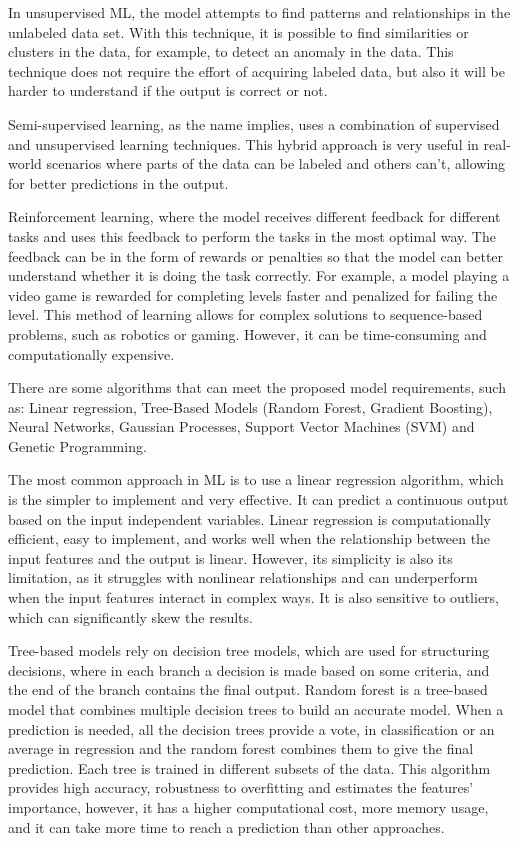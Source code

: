 \documentclass[sigplan]{acmart}
\begin{document}
In unsupervised ML, the model attempts to find patterns and relationships in the unlabeled data set. With this technique, it is possible to find similarities or clusters in the data, for example, to detect an anomaly in the data. This technique does not require the effort of acquiring labeled data, but also it will be harder to understand if the output is correct or not.

Semi-supervised learning, as the name implies, uses a combination of supervised and unsupervised learning techniques. This hybrid approach is very useful in real-world scenarios where parts of the data can be labeled and others can't, allowing for better predictions in the output.

Reinforcement learning, where the model receives different feedback for different tasks and uses this feedback to perform the tasks in the most optimal way. The feedback can be in the form of rewards or penalties so that the model can better understand whether it is doing the task correctly. For example, a model playing a video game is rewarded for completing levels faster and penalized for failing the level. This method of learning allows for complex solutions to sequence-based problems, such as robotics or gaming. However, it can be time-consuming and computationally expensive.

There are some algorithms that can meet the proposed model requirements, such as: Linear regression, Tree-Based Models (Random Forest, Gradient Boosting), Neural Networks, Gaussian Processes, Support Vector Machines (SVM) and Genetic Programming.

The most common approach in ML is to use a linear regression algorithm, which is the simpler to implement and very effective. It can predict a continuous output based on the input independent variables. Linear regression is computationally efficient, easy to implement, and works well when the relationship between the input features and the output is linear. However, its simplicity is also its limitation, as it struggles with nonlinear relationships and can underperform when the input features interact in complex ways. It is also sensitive to outliers, which can significantly skew the results.

Tree-based models rely on decision tree models, which are used for structuring decisions, where in each branch a decision is made based on some criteria, and the end of the branch contains the final output. Random forest is a tree-based model that combines multiple decision trees to build an accurate model. When a prediction is needed, all the decision trees provide a vote, in classification or an average in regression and the random forest combines them to give the final prediction. Each tree is trained in different subsets of the data. This algorithm provides high accuracy, robustness to overfitting and estimates the features' importance, however, it has a higher computational cost, more memory usage, and it can take more time to reach a prediction than other approaches.
\end{document}
